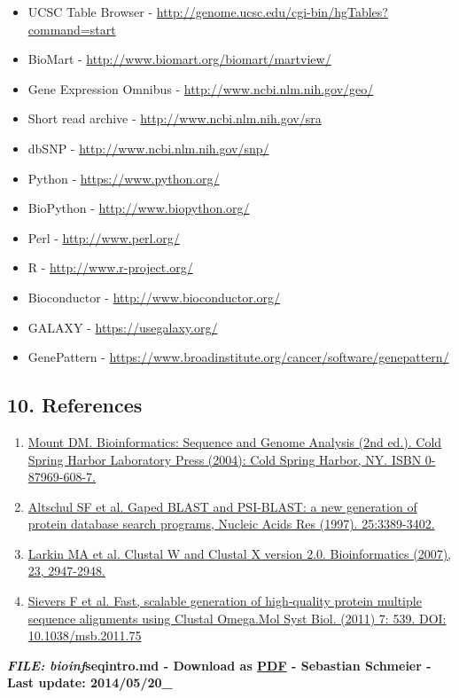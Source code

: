 \documentclass[]{article}
\begin{document}
\begin{itemize}
\item
  UCSC Table Browser -
  \url{http://genome.ucsc.edu/cgi-bin/hgTables?command=start}
\item
  BioMart - \url{http://www.biomart.org/biomart/martview/}
\item
  Gene Expression Omnibus - \url{http://www.ncbi.nlm.nih.gov/geo/}
\item
  Short read archive - \url{http://www.ncbi.nlm.nih.gov/sra}
\item
  dbSNP - \url{http://www.ncbi.nlm.nih.gov/snp/}
\item
  Python - \url{https://www.python.org/}
\item
  BioPython - \url{http://www.biopython.org/}
\item
  Perl - \url{http://www.perl.org/}
\item
  R - \url{http://www.r-project.org/}
\item
  Bioconductor - \url{http://www.bioconductor.org/}
\item
  GALAXY - \url{https://usegalaxy.org/}
\item
  GenePattern -
  \url{https://www.broadinstitute.org/cancer/software/genepattern/}
\end{itemize}

\subsection{10. References}\label{references}

\begin{enumerate}
\def\labelenumi{\arabic{enumi}.}
\itemsep1pt\parskip0pt
\item
  \href{http://www.cshlpress.com/default.tpl?cart=14004538673655488\&fromlink=T\&linkaction=full\&linksortby=oop_title\&--eqSKUdatarq=466}{Mount
  DM. Bioinformatics: Sequence and Genome Analysis (2nd ed.). Cold
  Spring Harbor Laboratory Press (2004): Cold Spring Harbor, NY. ISBN
  0-87969-608-7.}
\item
  \href{http://www.ncbi.nlm.nih.gov/pubmed/?term=9254694}{Altschul SF et
  al. Gaped BLAST and PSI-BLAST: a new generation of protein database
  search programs, Nucleic Acids Res (1997). 25:3389-3402.}
\item
  \href{http://www.ncbi.nlm.nih.gov/pubmed/17846036}{Larkin MA et al.
  Clustal W and Clustal X version 2.0. Bioinformatics (2007), 23,
  2947-2948.}
\item
  \href{http://msb.embopress.org/content/7/1/539}{Sievers F et al. Fast,
  scalable generation of high‐quality protein multiple sequence
  alignments using Clustal Omega.Mol Syst Biol. (2011) 7: 539. DOI:
  10.1038/msb.2011.75}
\end{enumerate}

\textbf{\emph{FILE: bioinf}seqintro.md - Download as
\href{http://compbio.massey.ac.nz/wiki/data/c1/doc/bioinf_seqintro.pdf}{PDF}
- Sebastian Schmeier - Last update: 2014/05/20\_}
\end{document}
